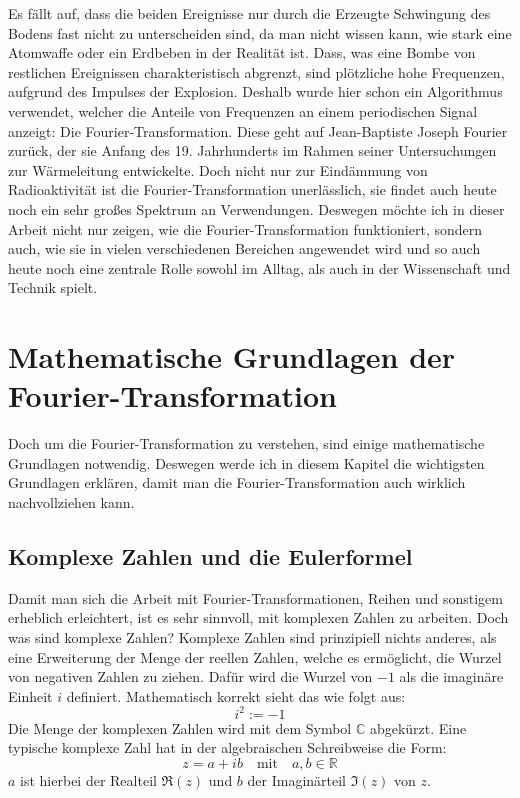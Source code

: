 \documentclass[a4paper,12pt]{article}
\theoremstyle{definition}
\theoremstyle{remark}
\begin{document}
Es fällt auf, dass die beiden Ereignisse nur durch die Erzeugte Schwingung des Bodens fast nicht zu unterscheiden sind, da 
man nicht wissen kann, wie stark eine Atomwaffe oder ein Erdbeben in der Realität ist. Dass, was eine Bombe von restlichen 
Ereignissen charakteristisch abgrenzt, sind plötzliche hohe Frequenzen, aufgrund des Impulses der Explosion. Deshalb wurde 
hier schon ein Algorithmus verwendet, welcher die Anteile von Frequenzen an einem periodischen Signal anzeigt: Die Fourier-Transformation. 
Diese geht auf Jean-Baptiste Joseph Fourier zurück, der sie Anfang des 19. Jahrhunderts im Rahmen seiner Untersuchungen zur Wärmeleitung entwickelte. 
Doch nicht nur zur Eindämmung von Radioaktivität ist die Fourier-Transformation unerlässlich, sie findet auch heute noch ein 
sehr großes Spektrum an Verwendungen. Deswegen möchte ich in dieser Arbeit nicht nur zeigen, wie die Fourier-Transformation 
funktioniert, sondern auch, wie sie in vielen verschiedenen Bereichen angewendet wird und so auch heute noch eine zentrale 
Rolle sowohl im Alltag, als auch in der Wissenschaft und Technik spielt.

\section{Mathematische Grundlagen der Fourier-Transformation}
Doch um die Fourier-Transformation zu verstehen, sind einige mathematische Grundlagen notwendig. Deswegen werde ich in diesem 
Kapitel die wichtigsten Grundlagen erklären, damit man die Fourier-Transformation auch wirklich nachvollziehen kann.
\subsection{Komplexe Zahlen und die Eulerformel}
Damit man sich die Arbeit mit Fourier-Transformationen, Reihen und sonstigem erheblich erleichtert, ist es sehr sinnvoll, mit komplexen Zahlen zu arbeiten. Doch was sind komplexe Zahlen? 
Komplexe Zahlen sind prinzipiell nichts anderes, als eine Erweiterung der Menge der reellen Zahlen, welche es ermöglicht, die Wurzel von negativen Zahlen zu ziehen. Dafür wird die Wurzel von $-1$ als die imaginäre Einheit $i$ definiert. Mathematisch korrekt sieht das wie folgt aus:
$$i^2 := -1$$
Die Menge der komplexen Zahlen wird mit dem Symbol $\mathbb{C}$ abgekürzt. Eine typische komplexe Zahl hat in der algebraischen Schreibweise die Form:
$$ z = a + ib \quad \text{mit} \quad a,b \in \mathbb{R} $$
$a$ ist hierbei der Realteil $\Re(z)$ und $b$ der Imaginärteil $\Im(z)$ von $z$. \vspace{1em}
\end{document}
